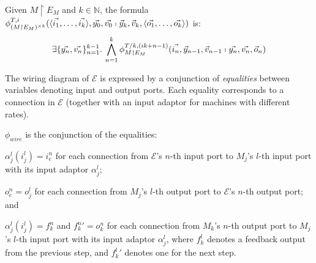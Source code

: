 \begin{definition}
Given $M \restriction E_M$ and $k \in \mathbb{N}$,
the formula
$\phi_{(M \restriction E_M)^{\times k}}^{T, i}(\langle\vec{i_1},\ldots,\vec{i_k}\rangle, \vec{y_0}, \vec{v_0} \shortmid \vec{y}_{k}, \vec{v}_{k}, \langle\vec{o_1},\ldots,\vec{o_k}\rangle)$ is:
\[
\exists\{\vec{y_n}, \vec{v_n}\}_{n=1}^{k-1}.\,
\bigwedge_{n=1}^k \phi_{M \restriction E_M}^{T/k,(ik+n-1)}(\vec{i_n}, \vec{y}_{n-1}, \vec{v}_{n-1} \shortmid \vec{y_{n}}, \vec{v_{n}}, \vec{o}_n)
\]
\end{definition}

The wiring diagram of $\mathcal{E}$ is expressed by
a conjunction of %
\emph{equalities} between variables denoting input and output ports.
Each equality corresponds to a connection in $\mathcal{E}$
(together with an input adaptor for machines with different rates).


\begin{definition}
$\phi_\mathit{wire}$ is the conjunction of the equalities:
\begin{inparaenum}[(i)]
	\item $\alpha_j^l(i_j^l) = i_e^n$
	for each connection from $\mathcal{E}$'s $n$-th input port to $M_j$'s $l$-th input port 
	with its input adaptor $\alpha_j^l$;
	\item $o_e^n = o_j^l$
	for each connection from $M_j$'s $l$-th output port to $\mathcal{E}$'s $n$-th output port; and
	\item $\alpha_j^l(i_j^l) = f_k^n$ and ${f_k^n}' = o_k^n$
	for each connection from $M_k$'s $n$-th output port to $M_j$'s $l$-th input port with its input adaptor $\alpha_j^l$,
	where $f_k^l$ denotes a feedback output from the previous step, 
	and ${f_k^l}'$ denotes one for the next step.
\end{inparaenum}
\end{definition}


